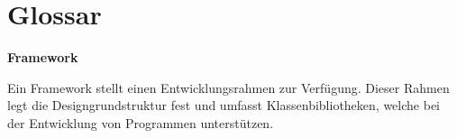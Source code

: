 \section*{Glossar}

\textbf{Framework}
\begin{adjustwidth}{1.5em}{}
	Ein Framework stellt einen Entwicklungsrahmen zur Verfügung. Dieser Rahmen legt die Designgrundstruktur fest und umfasst Klassenbibliotheken, welche bei der Entwicklung von Programmen unterstützen. 
\end{adjustwidth} \bigskip
